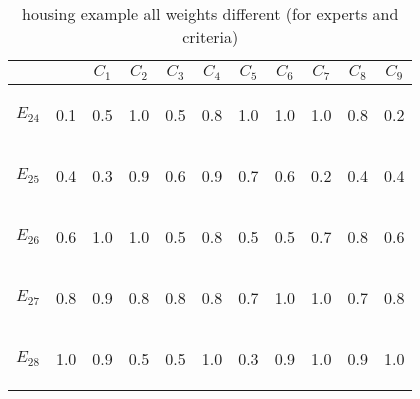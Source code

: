 \begin{table}[htp]
\begin{center}
\begin{tabular}{|cc|c|c|c|c|c|c|c|c|c|}
\hline \hline
& & $C_1$ & $C_2$ & $C_3$ & $C_4$ & $C_5$ & $C_6$ & $C_7$ & $C_8$ & $C_9$\\
\hline \hline
\begin{scriptsize}$E_{24}$\end{scriptsize} & \begin{scriptsize}0.1\end{scriptsize} & 0.5 & 1.0 & 0.5 & 0.8 & 1.0 & 1.0 & 1.0 & 0.8 & 0.2\\
\begin{scriptsize}$E_{25}$\end{scriptsize} & \begin{scriptsize}0.4\end{scriptsize} & 0.3 & 0.9 & 0.6 & 0.9 & 0.7 & 0.6 & 0.2 & 0.4 & 0.4\\
\begin{scriptsize}$E_{26}$\end{scriptsize} & \begin{scriptsize}0.6\end{scriptsize} & 1.0 & 1.0 & 0.5 & 0.8 & 0.5 & 0.5 & 0.7 & 0.8 & 0.6\\
\begin{scriptsize}$E_{27}$\end{scriptsize} & \begin{scriptsize}0.8\end{scriptsize} & 0.9 & 0.8 & 0.8 & 0.8 & 0.7 & 1.0 & 1.0 & 0.7 & 0.8\\
\begin{scriptsize}$E_{28}$\end{scriptsize} & \begin{scriptsize}1.0\end{scriptsize} & 0.9 & 0.5 & 0.5 & 1.0 & 0.3 & 0.9 & 1.0 & 0.9 & 1.0\\
\hline \hline
\end{tabular}
\end{center}
\caption{housing example all weights different (for experts and criteria)}
\label{allDifferent}
\end{table}